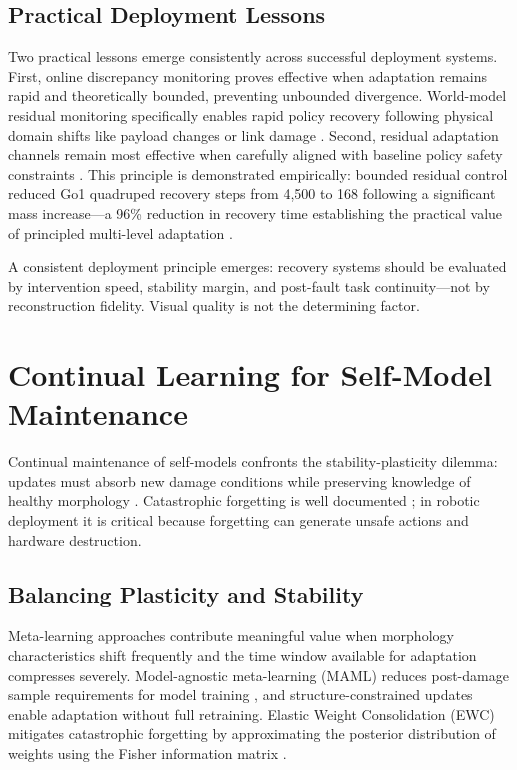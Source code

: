 \documentclass[12pt,a4paper,oneside]{report}
\begin{document}
\subsection{Practical Deployment Lessons}

Two practical lessons emerge consistently across successful deployment systems. First, online discrepancy monitoring proves effective when adaptation remains rapid and theoretically bounded, preventing unbounded divergence. World-model residual monitoring specifically enables rapid policy recovery following physical domain shifts like payload changes or link damage \cite{domberg2026selfadapting}. Second, residual adaptation channels remain most effective when carefully aligned with baseline policy safety constraints \cite{jayasinghe2026residual}. This principle is demonstrated empirically: bounded residual control reduced Go1 quadruped recovery steps from 4,500 to 168 following a significant mass increase---a 96\% reduction in recovery time establishing the practical value of principled multi-level adaptation \cite{jayasinghe2026residual}.

A consistent deployment principle emerges: recovery systems should be evaluated by intervention speed, stability margin, and post-fault task continuity---not by reconstruction fidelity. Visual quality is not the determining factor.

\section{Continual Learning for Self-Model Maintenance}

Continual maintenance of self-models confronts the stability-plasticity dilemma: updates must absorb new damage conditions while preserving knowledge of healthy morphology \cite{grossberg1987competitive, mermillod2013stability}. Catastrophic forgetting is well documented \cite{mccloskey1989catastrophic, french1999catastrophic}; in robotic deployment it is critical because forgetting can generate unsafe actions and hardware destruction.

\subsection{Balancing Plasticity and Stability}

Meta-learning approaches contribute meaningful value when morphology characteristics shift frequently and the time window available for adaptation compresses severely. Model-agnostic meta-learning (MAML) reduces post-damage sample requirements for model training \cite{finn2017maml}, and structure-constrained updates enable adaptation without full retraining. Elastic Weight Consolidation (EWC) mitigates catastrophic forgetting by approximating the posterior distribution of weights using the Fisher information matrix \cite{kirkpatrick2017overcoming}.
\end{document}
